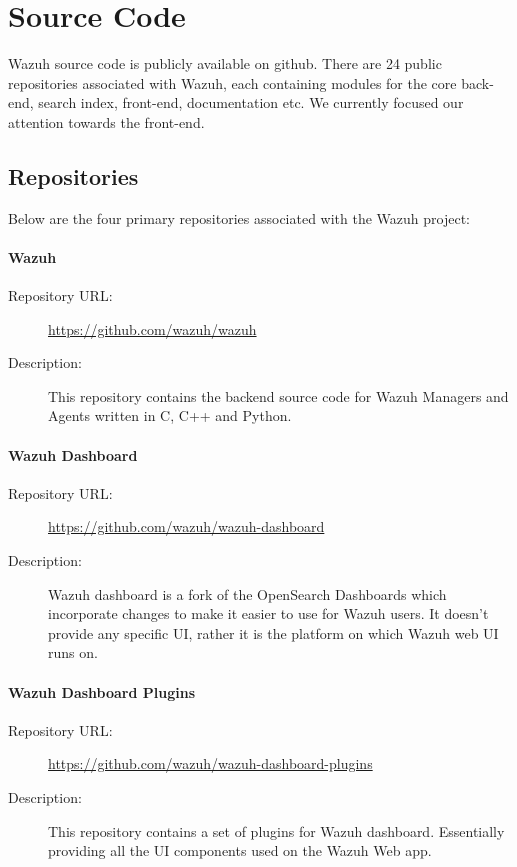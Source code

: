 \newpage
\section{Source Code}
Wazuh source code is publicly available on github. There are 24 public repositories associated with Wazuh, each containing modules for the core back-end, search index, front-end, documentation etc. We currently focused our attention towards the front-end.

\subsection{Repositories}
Below are the four primary repositories associated with the Wazuh project:

\paragraph{Wazuh}
\begin{description}
    \item[Repository URL:] \url{https://github.com/wazuh/wazuh}
    \item[Description:] This repository contains the backend source code for Wazuh Managers and Agents written in C, C++ and Python.
\end{description}

\paragraph{Wazuh Dashboard}
\begin{description}
    \item[Repository URL:] \url{https://github.com/wazuh/wazuh-dashboard}
    \item[Description:] Wazuh dashboard is a fork of the OpenSearch Dashboards which incorporate changes to make it easier to use for Wazuh users. It doesn't provide any specific UI, rather it is the platform on which Wazuh web UI runs on.
\end{description}

\paragraph{Wazuh Dashboard Plugins}
\begin{description}
    \item[Repository URL:] \url{https://github.com/wazuh/wazuh-dashboard-plugins}
    \item[Description:] This repository contains a set of plugins for Wazuh dashboard. Essentially providing all the UI components used on the Wazuh Web app.
\end{description}

